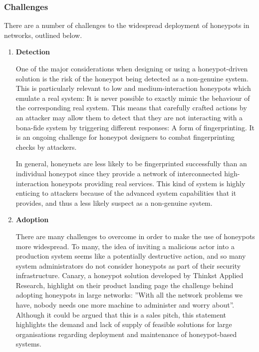 \subsubsection{Challenges} \label{HoneypotSoAChallenges}
There are a number of challenges to the widespread deployment of honeypots in networks, outlined below.
	\begin{enumerate}
    
    \item {\textbf{Detection}}
    
	One of the major considerations when designing or using a honeypot-driven solution is the risk of the honeypot being detected as a non-genuine system. This is particularly relevant to low and medium-interaction honeypots which emulate a real system: It is never possible to exactly mimic the behaviour of the corresponding real system. This means that carefully crafted actions by an attacker may allow them to detect that they are not interacting with a bona-fide system by triggering different responses: A form of fingerprinting. It is an ongoing challenge for honeypot designers to combat fingerprinting checks by attackers.
    
    In general, honeynets are less likely to be fingerprinted successfully than an individual honeypot since they provide a network of interconnected high-interaction honeypots providing real services. This kind of system is highly enticing to attackers because of the advanced system capabilities that it provides, and thus a less likely suspect as a non-genuine system.

	\item{\textbf{Adoption}}
    
	There are many challenges to overcome in order to make the use of honeypots more widespread. To many, the idea of inviting a malicious actor into a production system seems like a potentially destructive action, and so many system administrators do not consider honeypots as part of their security infrastructure. Canary, a honeypot solution developed by Thinkst Applied Research, highlight on their product landing page the challenge behind adopting honeypots in large networks: ''With all the network problems we have, nobody needs one more machine to administer and worry about''. \cite{CanaryThinkst} Although it could be argued that this is a sales pitch, this statement highlights the demand and lack of supply of feasible solutions for large organisations regarding deployment and maintenance of honeypot-based systems. 
	

\end{enumerate}

